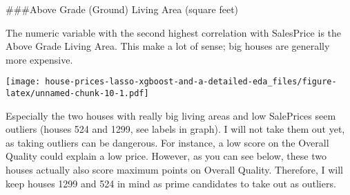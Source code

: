 \documentclass[]{article}
\newenvironment{Shaded}{\begin{snugshade}}{\end{snugshade}}
\newcommand{\DataTypeTok}[1]{\textcolor[rgb]{0.13,0.29,0.53}{#1}}
\newcommand{\DecValTok}[1]{\textcolor[rgb]{0.00,0.00,0.81}{#1}}
\newcommand{\KeywordTok}[1]{\textcolor[rgb]{0.13,0.29,0.53}{\textbf{#1}}}
\newcommand{\NormalTok}[1]{#1}
\newcommand{\OperatorTok}[1]{\textcolor[rgb]{0.81,0.36,0.00}{\textbf{#1}}}
\newcommand{\OtherTok}[1]{\textcolor[rgb]{0.56,0.35,0.01}{#1}}
\newcommand{\StringTok}[1]{\textcolor[rgb]{0.31,0.60,0.02}{#1}}
\begin{document}
\#\#\#Above Grade (Ground) Living Area (square feet)

The numeric variable with the second highest correlation with SalesPrice
is the Above Grade Living Area. This make a lot of sense; big houses are
generally more expensive.

\begin{Shaded}
\end{Shaded}

\texttt{[image: house-prices-lasso-xgboost-and-a-detailed-eda\_files/figure-latex/unnamed-chunk-10-1.pdf]}

Especially the two houses with really big living areas and low
SalePrices seem outliers (houses 524 and 1299, see labels in graph). I
will not take them out yet, as taking outliers can be dangerous. For
instance, a low score on the Overall Quality could explain a low price.
However, as you can see below, these two houses actually also score
maximum points on Overall Quality. Therefore, I will keep houses 1299
and 524 in mind as prime candidates to take out as outliers.
\end{document}
